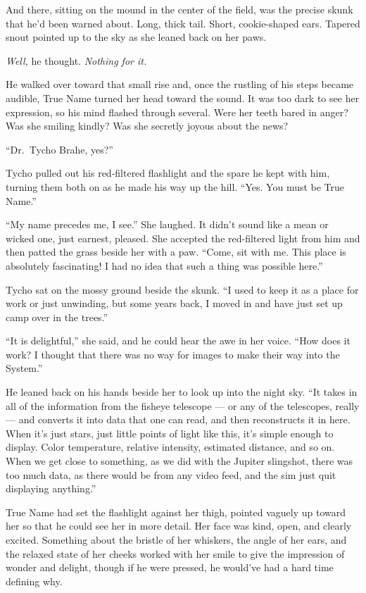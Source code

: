 And there, sitting on the mound in the center of the field, was the precise skunk that he'd been warned about. Long, thick tail. Short, cookie-shaped ears. Tapered snout pointed up to the sky as she leaned back on her paws.

\emph{Well,} he thought. \emph{Nothing for it.}

He walked over toward that small rise and, once the rustling of his steps became audible, True Name turned her head toward the sound. It was too dark to see her expression, so his mind flashed through several. Were her teeth bared in anger? Was she smiling kindly? Was she secretly joyous about the news?

``Dr.~Tycho Brahe, yes?''

Tycho pulled out his red-filtered flashlight and the spare he kept with him, turning them both on as he made his way up the hill. ``Yes. You must be True Name.''

``My name precedes me, I see.'' She laughed. It didn't sound like a mean or wicked one, just earnest, pleased. She accepted the red-filtered light from him and then patted the grass beside her with a paw. ``Come, sit with me. This place is absolutely fascinating! I had no idea that such a thing was possible here.''

Tycho sat on the mossy ground beside the skunk. ``I used to keep it as a place for work or just unwinding, but some years back, I moved in and have just set up camp over in the trees.''

``It is delightful,'' she said, and he could hear the awe in her voice. ``How does it work? I thought that there was no way for images to make their way into the System.''

He leaned back on his hands beside her to look up into the night sky. ``It takes in all of the information from the fisheye telescope — or any of the telescopes, really — and converts it into data that one can read, and then reconstructs it in here. When it's just stars, just little points of light like this, it's simple enough to display. Color temperature, relative intensity, estimated distance, and so on. When we get close to something, as we did with the Jupiter slingshot, there was too much data, as there would be from any video feed, and the sim just quit displaying anything.''

True Name had set the flashlight against her thigh, pointed vaguely up toward her so that he could see her in more detail. Her face was kind, open, and clearly excited. Something about the bristle of her whiskers, the angle of her ears, and the relaxed state of her cheeks worked with her smile to give the impression of wonder and delight, though if he were pressed, he would've had a hard time defining why.

